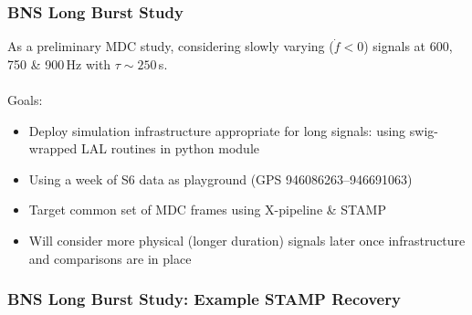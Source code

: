 \documentclass{beamer}
\begin{document}
\begin{frame}
    \frametitle{BNS Long Burst Study}
    As a preliminary MDC study, considering slowly varying ($\dot{f}<0$) signals
    at 600, 750 \& 900\,Hz with $\tau\sim250$\,s.\\~\\

    Goals:
    \begin{itemize}
        \item Deploy simulation infrastructure appropriate for long signals:
            using swig-wrapped LAL routines in python module
        \item Using a week of S6 data as playground (GPS 946086263--946691063)
        \item Target common set of MDC frames using X-pipeline \& STAMP
        \item Will consider more physical (longer duration) signals later once
            infrastructure and comparisons are in place
    \end{itemize}

\end{frame}

\begin{frame}
    \frametitle{BNS Long Burst Study: Example STAMP Recovery}
    \begin{figure}
        \centering
    \end{figure}
\end{frame}
\end{document}
